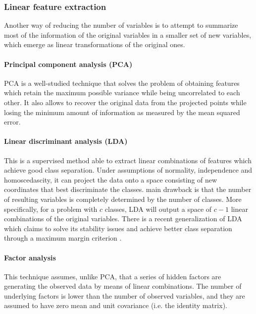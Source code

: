 \subsubsection{Linear feature extraction}

Another way of reducing the number of variables is to attempt to summarize most of the information of the original variables in a smaller set of new variables, which emerge as linear transformations of the original ones.

\paragraph*{Principal component analysis (PCA) } PCA  is a well-studied technique that solves the problem of obtaining features which retain the maximum possible variance while being uncorrelated to each other. It also allows to recover the original data from the projected points while losing the minimum amount of information as measured by the mean squared error. %

\paragraph*{Linear discriminant analysis (LDA) } This is a supervised method able to extract linear combinations of features which achieve good class separation. Under assumptions of normality, independence and homoscedascity, it can project the data onto a space consisting of new coordinates that best discriminate the classes.  main drawback is that the number of resulting variables is completely determined by the number of classes. More specifically, for a problem with $c$ classes, LDA will output a space of $c-1$ linear combinations of the original variables. There is a recent generalization of LDA which claims to solve its stability issues and achieve better class separation through a maximum margin criterion .

\paragraph*{Factor analysis } This technique assumes, unlike PCA, that a series of hidden factors are generating the observed data by means of linear combinations. The number of underlying factors is lower than the number of observed variables, and they are assumed to have zero mean and unit covariance (i.e. the identity matrix). %

